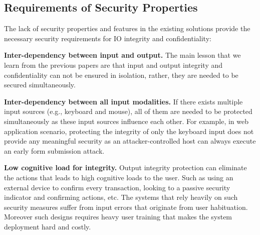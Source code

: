 \subsection{Requirements of Security Properties}
\label{sec:problemStatement:goals}

The lack of security properties and features in the existing solutions provide the necessary security requirements for IO integrity and confidentiality:


\begin{mylist}
  \item \textbf{Inter-dependency between input and output.} The main lesson that we learn from the previous papers are that input and output integrity and confidentiality can not be ensured in isolation, rather, they are needed to be secured simultaneously.  

  \item \textbf{Inter-dependency between all input modalities.} If there exists multiple input sources (e.g., keyboard and mouse), all of them are needed to be protected simultaneously as these input sources influence each other. For example, in web application scenario, protecting the integrity of only the keyboard input does not provide any meaningful security as an attacker-controlled host can always execute an early form submission attack.

  
  \item \textbf{Low cognitive load for integrity.} Output integrity protection can eliminate the actions that leads to high cognitive loads to the user.  Such as using an external device to confirm every transaction, looking to a passive security indicator and confirming actions, etc. The systems that rely heavily on such security measures suffer from input errors that originate from user habituation. Moreover such designs requires heavy user training that makes the system deployment hard and costly.
  


\end{mylist}
